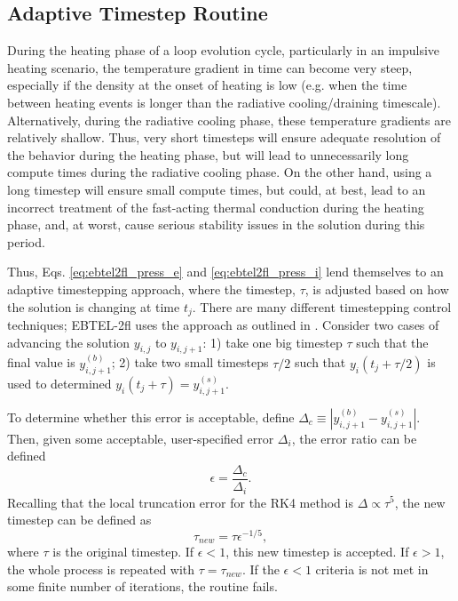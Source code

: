 \subsection{Adaptive Timestep Routine}
\label{subsec:adapt}
%
\par During the heating phase of a loop evolution cycle, particularly in an impulsive heating scenario, the temperature gradient in time can become very steep, especially if the density at the onset of heating is low (e.g. when the time between heating events is longer than the radiative cooling/draining timescale). Alternatively, during the radiative cooling phase, these temperature gradients are relatively shallow. Thus, very short timesteps will ensure adequate resolution of the behavior during the heating phase, but will lead to unnecessarily long compute times during the radiative cooling phase. On the other hand, using a long timestep will ensure small compute times, but could, at best, lead to an incorrect treatment of the fast-acting thermal conduction during the heating phase, and, at worst, cause serious stability issues in the solution during this period. 
%
\par Thus, Eqs. \ref{eq:ebtel2fl_press_e} and \ref{eq:ebtel2fl_press_i} lend themselves to an adaptive timestepping approach, where the timestep, $\tau$, is adjusted based on how the solution is changing at time $t_j$. There are many different timestepping control techniques; EBTEL-2fl uses the approach as outlined in \citet{garcia_numerical_2000}. Consider two cases of advancing the solution $y_{i,j}$ to $y_{i,j+1}$: 1) take one big timestep $\tau$ such that the final value is $y_{i,j+1}^{(b)}$; 2) take two small timesteps $\tau/2$ such that $y_i(t_j+\tau/2)$ is used to determined $y_i(t_j+\tau)=y_{i,j+1}^{(s)}$. 
%
\par To determine whether this error is acceptable, define $\Delta_c\equiv|y_{i,j+1}^{(b)} - y_{i,j+1}^{(s)}|$. Then, given some acceptable, user-specified error $\Delta_i$, the error ratio can be defined
\begin{equation}
	\epsilon = \frac{\Delta_c}{\Delta_i}.
\end{equation}
Recalling that the local truncation error for the RK4 method is $\Delta\propto\tau^5$, the new timestep can be defined as
\begin{equation}
	\tau_{new}=\tau\epsilon^{-1/5},
\end{equation}
where $\tau$ is the original timestep. If $\epsilon<1$, this new timestep is accepted. If $\epsilon>1$, the whole process is repeated with $\tau=\tau_{new}$. If the $\epsilon<1$ criteria is not met in some finite number of iterations, the routine fails.
%